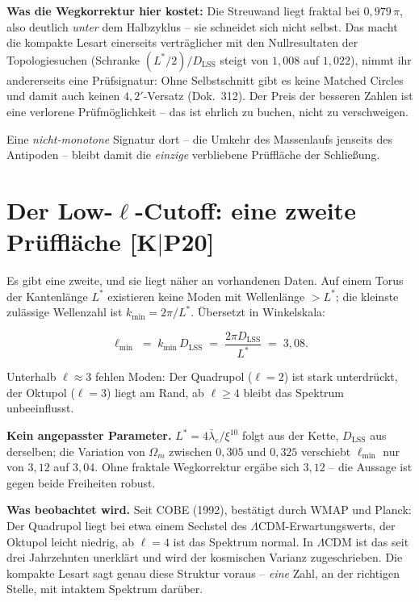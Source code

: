 \documentclass[11pt]{report}
\begin{document}
\textbf{Was die Wegkorrektur hier kostet:} Die Streuwand liegt
fraktal bei $0{,}979\,\pi$, also deutlich \emph{unter} dem
Halbzyklus -- sie schneidet sich nicht selbst. Das macht die
kompakte Lesart einerseits verträglicher mit den Nullresultaten
der Topologiesuchen (Schranke $(L^{*}/2)/D_\text{LSS}$ steigt von
$1{,}008$ auf $1{,}022$), nimmt ihr andererseits eine
Prüfsignatur: Ohne Selbstschnitt gibt es keine Matched Circles und
damit auch keinen $4{,}2'$-Versatz (Dok.~312). Der Preis der
besseren Zahlen ist eine verlorene Prüfmöglichkeit -- das ist
ehrlich zu buchen, nicht zu verschweigen.

Eine \emph{nicht-monotone} Signatur dort -- die Umkehr des
Massenlaufs jenseits des Antipoden -- bleibt damit die
\emph{einzige} verbliebene Prüffläche der Schließung.

\section{Der Low-$\ell$-Cutoff: eine zweite Prüffläche [K$|$P20]}

Es gibt eine zweite, und sie liegt näher an vorhandenen Daten. Auf
einem Torus der Kantenlänge $L^{*}$ existieren keine Moden mit
Wellenlänge $> L^{*}$; die kleinste zulässige Wellenzahl ist
$k_\text{min} = 2\pi/L^{*}$. Übersetzt in Winkelskala:

\begin{equation}
  \ell_\text{min} \;=\; k_\text{min}\,D_\text{LSS}
  \;=\; \frac{2\pi D_\text{LSS}}{L^{*}} \;=\; 3{,}08 .
\end{equation}

\noindent Unterhalb $\ell \approx 3$ fehlen Moden: Der Quadrupol
($\ell = 2$) ist stark unterdrückt, der Oktupol ($\ell = 3$) liegt
am Rand, ab $\ell \ge 4$ bleibt das Spektrum unbeeinflusst.

\textbf{Kein angepasster Parameter.} $L^{*} = 4\bar\lambda_e/
\xi^{10}$ folgt aus der Kette, $D_\text{LSS}$ aus derselben; die
Variation von $\Omega_m$ zwischen $0{,}305$ und $0{,}325$
verschiebt $\ell_\text{min}$ nur von $3{,}12$ auf $3{,}04$. Ohne
fraktale Wegkorrektur ergäbe sich $3{,}12$ -- die Aussage ist
gegen beide Freiheiten robust.

\textbf{Was beobachtet wird.} Seit COBE (1992), bestätigt durch
WMAP und Planck: Der Quadrupol liegt bei etwa einem Sechstel des
$\Lambda$CDM-Erwartungswerts, der Oktupol leicht niedrig, ab
$\ell = 4$ ist das Spektrum normal. In $\Lambda$CDM ist das seit
drei Jahrzehnten unerklärt und wird der kosmischen Varianz
zugeschrieben. Die kompakte Lesart sagt genau diese Struktur
voraus -- \emph{eine} Zahl, an der richtigen Stelle, mit intaktem
Spektrum darüber.
\end{document}
